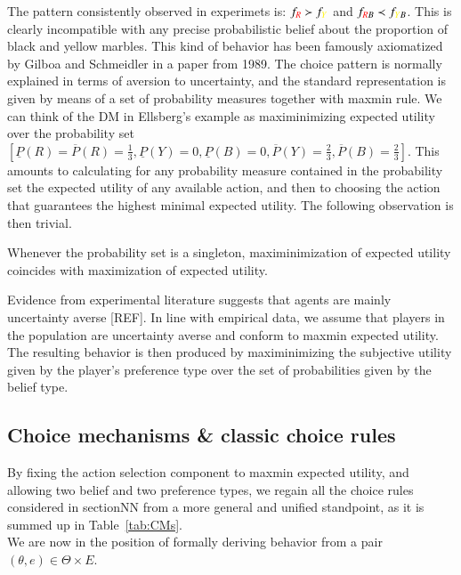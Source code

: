\documentclass[fleqn,reqno,11pt]{article}
\begin{document}
The pattern consistently observed in experimets is: $f_{{\color{red}R}} \succ f_{{\color{yellow}Y}}$ and $f_{{\color{red}R}B} \prec f_{{\color{yellow}Y}B}$. This is clearly incompatible with any precise probabilistic belief about the proportion of black and yellow marbles. This kind of behavior has been
famously axiomatized by Gilboa and Schmeidler in a paper from 1989. The choice pattern is normally explained in terms of aversion to uncertainty, and the standard representation is given by means of a set of probability measures together with maxmin rule. We can think of the DM in Ellsberg's example as maximinimizing expected utility over the probability set $ [\underline{P}(R)=\overline{P}(R)=\frac{1}{3},\underline{P}(Y)=0,\underline{P}(B)=0,\overline{P}(Y)=\frac{2}{3},\overline{P}(B)=\frac{2}{3}]  $. This amounts to calculating for any probability measure contained in the probability set the expected utility of any available action, and then to choosing the action that guarantees the highest minimal expected utility. The following observation is then trivial.

\begin{fact} \label{fact:singleton probability set}
Whenever the probability set is a singleton, maximinimization of
expected utility coincides with maximization of expected utility.
\end{fact}

Evidence from experimental literature suggests that agents are mainly uncertainty
averse [REF]. In line with empirical data,
we assume that players in the population are uncertainty averse and conform to maxmin expected
utility. The resulting behavior is then produced by maximinimizing the subjective utility
given by the player's preference type over the set of probabilities given by the belief type.



\subsection{Choice mechanisms \& classic choice rules}

By fixing the action selection component to maxmin expected utility, and allowing two belief and
two preference types, we regain all the choice rules considered in sectionNN from a more general and unified standpoint, as it is summed up in
Table~\ref{tab:CMs}. \\
We are now in the position of formally deriving behavior from a pair $(\theta, e) \in \Theta \times E$.
\end{document}
